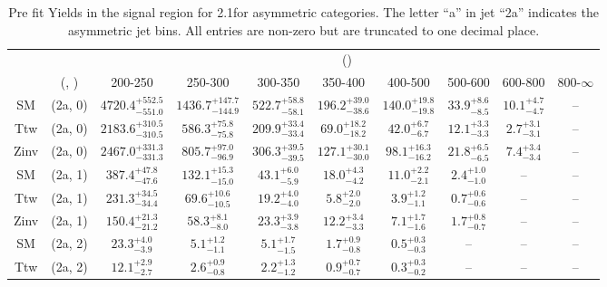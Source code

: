 \begin{table}[h!]
\tiny
\centering
\caption{Pre fit Yields in the signal region for 2.1\ifb for asymmetric categories. The letter ``a'' in jet \eg ``2a''  indicates the asymmetric jet bins. All entries are non-zero but are truncated to one decimal place.\label{tab:prednodatanaive_sig_comb_asym}}
\begin{tabular}
{cccccccccc}
	\hline\hline
	&	& \multicolumn{8}{c}{\scalht (\gev)}\\ 
	&	 (\njet, \nb) & 200-250 & 250-300 & 300-350 & 350-400 & 400-500 & 500-600 & 600-800 & 800-$\infty$ \\ [0.8ex] 
\hline
	SM & (2a, 0) & $4720.4^{+ 552.5 }_{- 551.0 }$ & $1436.7^{+ 147.7 }_{- 144.9 }$ & $522.7^{+ 58.8 }_{- 58.1 }$ & $196.2^{+ 39.0 }_{- 38.6 }$ & $140.0^{+ 19.8 }_{- 19.8 }$ & $33.9^{+ 8.6 }_{- 8.5 }$ & $10.1^{+ 4.7 }_{- 4.7 }$ & -- \\[0.5ex] 
	Ttw & (2a, 0) & $2183.6^{+ 310.5 }_{- 310.5 }$ & $586.3^{+ 75.8 }_{- 75.8 }$ & $209.9^{+ 33.4 }_{- 33.4 }$ & $69.0^{+ 18.2 }_{- 18.2 }$ & $42.0^{+ 6.7 }_{- 6.7 }$ & $12.1^{+ 3.3 }_{- 3.3 }$ & $2.7^{+ 3.1 }_{- 3.1 }$ & -- \\[0.5ex] 
	Zinv & (2a, 0) & $2467.0^{+ 331.3 }_{- 331.3 }$ & $805.7^{+ 97.0 }_{- 96.9 }$ & $306.3^{+ 39.5 }_{- 39.5 }$ & $127.1^{+ 30.1 }_{- 30.0 }$ & $98.1^{+ 16.3 }_{- 16.2 }$ & $21.8^{+ 6.5 }_{- 6.5 }$ & $7.4^{+ 3.4 }_{- 3.4 }$ & -- \\[0.5ex] 
	SM & (2a, 1) & $387.4^{+ 47.8 }_{- 47.6 }$ & $132.1^{+ 15.3 }_{- 15.0 }$ & $43.1^{+ 6.0 }_{- 5.9 }$ & $18.0^{+ 4.3 }_{- 4.2 }$ & $11.0^{+ 2.2 }_{- 2.1 }$ & $2.4^{+ 1.0 }_{- 1.0 }$ & -- & -- \\[0.5ex] 
	Ttw & (2a, 1) & $231.3^{+ 34.5 }_{- 34.4 }$ & $69.6^{+ 10.6 }_{- 10.5 }$ & $19.2^{+ 4.0 }_{- 4.0 }$ & $5.8^{+ 2.0 }_{- 2.0 }$ & $3.9^{+ 1.2 }_{- 1.1 }$ & $0.7^{+ 0.6 }_{- 0.6 }$ & -- & -- \\[0.5ex] 
	Zinv & (2a, 1) & $150.4^{+ 21.3 }_{- 21.2 }$ & $58.3^{+ 8.1 }_{- 8.0 }$ & $23.3^{+ 3.9 }_{- 3.8 }$ & $12.2^{+ 3.4 }_{- 3.3 }$ & $7.1^{+ 1.7 }_{- 1.6 }$ & $1.7^{+ 0.8 }_{- 0.7 }$ & -- & -- \\[0.5ex] 
	SM & (2a, 2) & $23.3^{+ 4.0 }_{- 3.9 }$ & $5.1^{+ 1.2 }_{- 1.1 }$ & $5.1^{+ 1.7 }_{- 1.5 }$ & $1.7^{+ 0.9 }_{- 0.8 }$ & $0.5^{+ 0.3 }_{- 0.3 }$ & -- & -- & -- \\[0.5ex] 
	Ttw & (2a, 2) & $12.1^{+ 2.9 }_{- 2.7 }$ & $2.6^{+ 0.9 }_{- 0.8 }$ & $2.2^{+ 1.3 }_{- 1.2 }$ & $0.9^{+ 0.7 }_{- 0.7 }$ & $0.3^{+ 0.3 }_{- 0.2 }$ & -- & -- & -- \\[0.5ex] 

\end{tabular}
\end{table}
